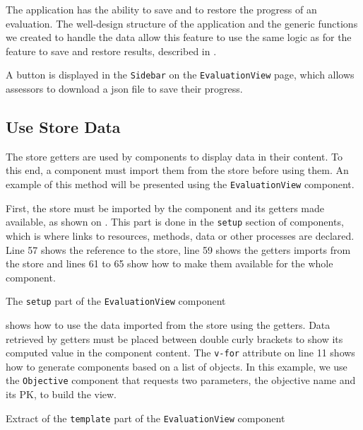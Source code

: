 The application has the ability to save and to restore the progress of an evaluation. The well-design structure of the application and the generic functions we created to handle the data allow this feature to use the same logic as for the feature to save and restore results, described in .

A button is displayed in the \texttt{Sidebar} on the \texttt{EvaluationView} page, which allows assessors to download a \gls{json} file to save their progress.

\subsection{Use Store Data}
\label{subsec:app_implementation_use}

The store getters are used by components to display data in their content. To this end, a component must import them from the store before using them. An example of this method will be presented using the \texttt{EvaluationView} component.

First, the store must be imported by the component and its getters made available, as shown on . This part is done in the \texttt{setup} section of components, which is where links to resources, methods, data or other  processes are declared. Line 57 shows the reference to the store, line 59 shows the getters imports from the store and lines 61 to 65 show how to make them available for the whole component.

\begin{listing}[!ht] 
	\caption{The \texttt{setup} part of the \texttt{EvaluationView} component}
	\label{lst:app_implementation_use_setup}
\end{listing}

 shows how to use the data imported from the store using the getters. Data retrieved by getters must be placed between double curly brackets to show its computed value in the component content. The \texttt{v-for} attribute on line 11 shows how to generate components based on a list of objects. In this example, we use the \texttt{Objective} component that requests two parameters, the objective name and its PK, to build the view.

\begin{listing}[!ht] 
	\caption{Extract of the \texttt{template} part of the \texttt{EvaluationView} component}
	\label{lst:app_implementation_use_template}
\end{listing}

